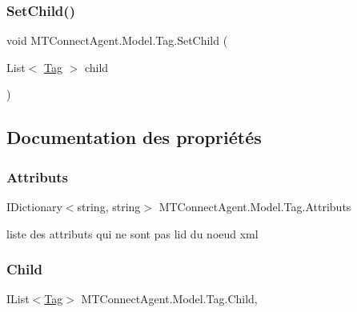 \subsubsection{\texorpdfstring{Set\+Child()}{SetChild()}}
{\footnotesize\ttfamily void M\+T\+Connect\+Agent.\+Model.\+Tag.\+Set\+Child (\begin{DoxyParamCaption}\item[{List$<$ \mbox{\hyperlink{class_m_t_connect_agent_1_1_model_1_1_tag}{Tag}} $>$}]{child }\end{DoxyParamCaption})\hspace{0.3cm}{\ttfamily [inline]}}



\subsection{Documentation des propriétés}
\mbox{\label{class_m_t_connect_agent_1_1_model_1_1_tag_a52005acad928b8e2c84b6dbfbdb2603f}} 
\subsubsection{\texorpdfstring{Attributs}{Attributs}}
{\footnotesize\ttfamily I\+Dictionary$<$string, string$>$ M\+T\+Connect\+Agent.\+Model.\+Tag.\+Attributs\hspace{0.3cm}{\ttfamily [get]}}



liste des attributs qui ne sont pas l\textquotesingle{}id du noeud xml 

\mbox{\label{class_m_t_connect_agent_1_1_model_1_1_tag_a4aca782fa5c34818b94fb4c0beceab4b}} 
\subsubsection{\texorpdfstring{Child}{Child}}
{\footnotesize\ttfamily I\+List$<$\mbox{\hyperlink{class_m_t_connect_agent_1_1_model_1_1_tag}{Tag}}$>$ M\+T\+Connect\+Agent.\+Model.\+Tag.\+Child\hspace{0.3cm}{\ttfamily [get]}, {}}



